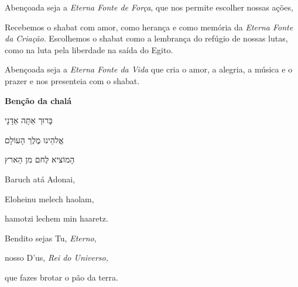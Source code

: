 Abençoada seja a \emph{Eterna Fonte de Força}, que nos permite escolher
nossas ações,

Recebemos o shabat com amor, como herança e como memória da \emph{Eterna
Fonte da Criação}. Escolhemos o shabat como a lembrança do refúgio de
nossas lutas, como na luta pela liberdade na saída do Egito.

Abençoada seja a \emph{Eterna Fonte da Vida} que cria o amor, a alegria,
a música e o prazer e nos presenteia com o shabat.

\textbf{Benção da chalá }

בָּרוּך אַתָּה אַדָנָי

אֱלהֵינוּ מֶלֶך הָעוֹלָם

הָמוֹציא לֶחם מן הַארץ

Baruch atá Adonai,

Eloheinu melech haolam,

hamotzi lechem min haaretz.

Bendito sejas Tu, \emph{Eterno},

nosso D'us, \emph{Rei do Universo,}

que fazes brotar o pão da terra.
